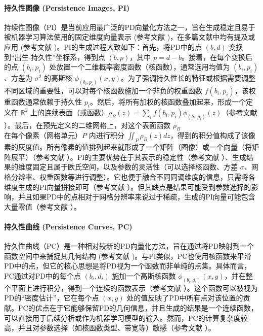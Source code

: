             \paragraph{持久性图像 (Persistence Images, PI)}
                \label{sec:feat_pi}
                持续性图像（PI）是当前应用最广泛的PD向量化方法之一，旨在生成稳定且易于被机器学习算法使用的固定维度向量表示 (参考文献 )，在多篇文献中均有提及或应用 (参考文献 )。PI的生成过程大致如下：首先，将PD中的点 $(b, d)$ 变换到“出生-持久性”坐标系，得到点 $(b, p)$，其中 $p = d-b$。接着，在每个变换后的点 $(b_i, p_i)$ 处放置一个二维概率密度函数（核函数），通常选用均值为 $(b_i, p_i)$、方差为 $\sigma^2$ 的高斯核 $\phi_{(b_i, p_i)}(x, y)$。为了强调持久性长的特征或根据需要调整不同区域的重要性，可以对每个核函数施加一个非负的权重函数 $f(b_i, p_i)$，该权重函数通常依赖于持久性 $p_i$。然后，将所有加权的核函数叠加起来，形成一个定义在 $\mathbb{R}^2$ 上的连续表面（或函数）$\rho_{B}(z) = \sum_i f(b_i, p_i) \phi_{(b_i, p_i)}(z)$（参考文献 ）。最后，在预先定义的二维网格上，对这个表面函数 $\rho_B$ 在每个像素（网格单元）$P$ 内进行积分 $\iint_P \rho_B(z) dz$，得到的积分值构成了该像素的灰度值。所有像素的值排列起来就形成了一个矩阵（图像）或一个向量（将矩阵展平）（参考文献 ）。PI的主要优势在于其表示的稳定性（参考文献 ）、生成结果的维度固定且属于欧氏空间，以及参数的灵活性（可以选择核函数、方差 $\sigma$、网格分辨率、权重函数等进行调整）。它也便于融合不同同调维度的信息，只需将各维度生成的PI向量拼接即可（参考文献 ）。但其缺点是结果可能受到参数选择的影响，并且如果PD中的点相对于网格分辨率来说过于稀疏，生成的PI向量可能包含大量零值（参考文献 ）。

            \paragraph{持久性曲线 (Persistence Curves, PC)}
                \label{sec:feat_pc}
                持久性曲线（PC）是一种相对较新的PD向量化方法，旨在通过将PD映射到一个函数空间中来捕捉其几何结构 (参考文献 )。与PI类似，PC也使用核函数来平滑PD中的点，但它的核心思想是将PD视为一个函数而非单纯的点集。具体而言，PC通过对PD中的每个点 $(b_i, d_i)$ 施加一个高斯核函数 $\phi_{(b_i, d_i)}(x, y)$，并在整个平面上进行积分，得到一个连续的函数表示（参考文献 ）。这个函数可以被视为PD的“密度估计”，它在每个点 $(x, y)$ 处的值反映了PD中所有点对该位置的贡献。PC的优点在于它能够保留PD的几何信息，并且生成的结果是一个连续函数，可以直接用于后续分析或作为机器学习模型的输入。然而，PC的计算复杂度较高，并且对参数选择（如核函数类型、带宽等）敏感（参考文献 ）。
